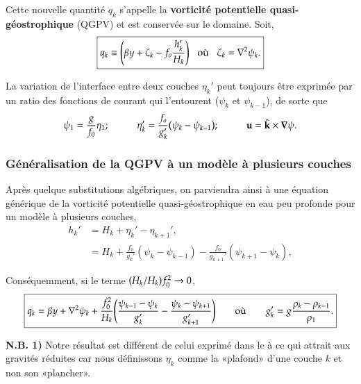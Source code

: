 \documentclass[10pt]{article}
\numberwithin{equation}{section}
\newcommand{\kvf}{\hat{\vb{k}}}
\begin{document}
Cette nouvelle quantité \(q_k\) s'appelle la \textbf{vorticité potentielle quasi-géostrophique} (QGPV) et est conservée sur le domaine.
Soit,
\begin{equation}
\label{eq:org1b6212f}
\boxed{q_k \equiv \qty( \beta  y + \zeta_k - f_o \frac{h_k'}{H_k})
\hspace{0.3cm} \text{où} \hspace{0.3cm}
\zeta_k = \laplacian \psi_k.}
\end{equation}

La variation de l'interface entre deux couches \(\eta_k'\) peut toujours être exprimée par un ratio des fonctions de courant qui l'entourent (\(\psi_{k}\) et \(\psi_{k-1}\)), de sorte que 
\begin{equation}
\psi_1 = \frac{g}{f_0} \eta_1; 
\hspace{1cm} \eta_k' = \frac{f_o}{g_k'} \qty(\psi_k - \psi_{k-1});
\hspace{1cm} \vb{u} = \kvf \times \gradient\psi.
\end{equation}

\subsubsection{Généralisation de la QGPV à un modèle à plusieurs couches}
\label{sec:org6e3f199}

Après quelque substitutions algébriques, on parviendra ainsi à une équation générique de la vorticité potentielle quasi-géostrophique en eau peu profonde pour un modèle à plusieurs couches,
\begin{align}
h_k' &= H_k + \eta_k' - \eta_{k+1}',\\
&= H_k + \frac{f_0}{g_k'} (\psi_k - \psi_{k-1}) - \frac{f_0}{g_{k+1}'} (\psi_{k+1} - \psi_k),
\end{align}

Conséquemment, si le terme \(\qty(H_k/H_k)f_0^2 \rightarrow 0\), 
\begin{equation}
\boxed{q_k  = \beta y + \laplacian \psi_k + \frac{f_0^2}{H_k} \qty(\frac{\psi_{k-1}-\psi_k}{g_k'} -  \frac{\psi_k - \psi_{k+1}}{g_{k+1}'})
\hspace{0.7cm} \text{où} \hspace{0.7cm}
g_k' = g \frac{\rho_k - \rho_{k-1}}{\rho_1}.}
\end{equation}

\textbf{N.B. 1)} Notre résultat est différent de celui exprimé dans le \citep[, p.185]{vallis_2006} à ce qui attrait aux gravités réduites car nous définissons \(\eta_k\) comme la «plafond» d'une couche \(k\) et non son «plancher».\\[0pt]
\end{document}
